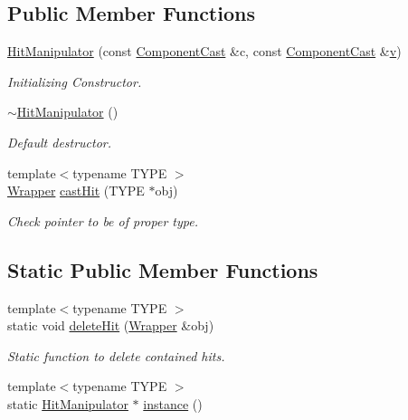\subsection*{Public Member Functions}
\begin{DoxyCompactItemize}
\item 
\hyperlink{class_d_d4hep_1_1_simulation_1_1_geant4_hit_wrapper_1_1_hit_manipulator_ab04f459fb64ae024b2dcf7f7fb0d7775}{Hit\+Manipulator} (const \hyperlink{class_d_d4hep_1_1_component_cast}{Component\+Cast} \&c, const \hyperlink{class_d_d4hep_1_1_component_cast}{Component\+Cast} \&\hyperlink{_multi_view_8cpp_a8320ee13ac034dbf6d624fe8953dd337}{v})
\begin{DoxyCompactList}\small\item\em Initializing Constructor. \end{DoxyCompactList}\item 
\hyperlink{class_d_d4hep_1_1_simulation_1_1_geant4_hit_wrapper_1_1_hit_manipulator_a61e4ad1fbefa9c366136011854d033e0}{$\sim$\+Hit\+Manipulator} ()
\begin{DoxyCompactList}\small\item\em Default destructor. \end{DoxyCompactList}\item 
{\footnotesize template$<$typename T\+Y\+PE $>$ }\\\hyperlink{class_d_d4hep_1_1_simulation_1_1_geant4_hit_wrapper_1_1_hit_manipulator_a4bb62cc7e4979a8d0aea281477a4e38e}{Wrapper} \hyperlink{class_d_d4hep_1_1_simulation_1_1_geant4_hit_wrapper_1_1_hit_manipulator_a593e21925633b7b165bd78287de5e294}{cast\+Hit} (T\+Y\+PE $\ast$obj)
\begin{DoxyCompactList}\small\item\em Check pointer to be of proper type. \end{DoxyCompactList}\end{DoxyCompactItemize}
\subsection*{Static Public Member Functions}
\begin{DoxyCompactItemize}
\item 
{\footnotesize template$<$typename T\+Y\+PE $>$ }\\static void \hyperlink{class_d_d4hep_1_1_simulation_1_1_geant4_hit_wrapper_1_1_hit_manipulator_ac5036ee6d5e3a50a861344b1ec9fbf96}{delete\+Hit} (\hyperlink{class_d_d4hep_1_1_simulation_1_1_geant4_hit_wrapper_1_1_hit_manipulator_a4bb62cc7e4979a8d0aea281477a4e38e}{Wrapper} \&obj)
\begin{DoxyCompactList}\small\item\em Static function to delete contained hits. \end{DoxyCompactList}\item 
{\footnotesize template$<$typename T\+Y\+PE $>$ }\\static \hyperlink{class_d_d4hep_1_1_simulation_1_1_geant4_hit_wrapper_1_1_hit_manipulator}{Hit\+Manipulator} $\ast$ \hyperlink{class_d_d4hep_1_1_simulation_1_1_geant4_hit_wrapper_1_1_hit_manipulator_ab56e7a7a62be9eccd4695590159ce941}{instance} ()
\end{DoxyCompactItemize}
